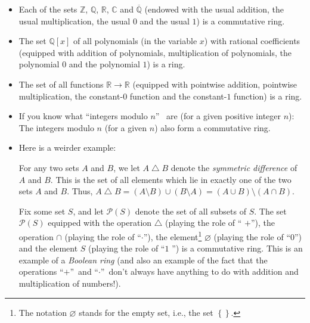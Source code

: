 \documentclass[numbers=enddot,12pt,final,onecolumn,notitlepage]{scrartcl}%
\theoremstyle{definition}
\begin{document}
\begin{itemize}
\item Each of the sets $\mathbb{Z}$, $\mathbb{Q}$, $\mathbb{R}$, $\mathbb{C}$
and $\overline{\mathbb{Q}}$ (endowed with the usual addition, the usual
multiplication, the usual $0$ and the usual $1$) is a commutative ring.

\item The set $\mathbb{Q}\left[  x\right]  $ of all polynomials (in the
variable $x$) with rational coefficients (equipped with addition of
polynomials, multiplication of polynomials, the polynomial $0$ and the
polynomial $1$) is a ring.

\item The set of all functions $\mathbb{R}\rightarrow\mathbb{R}$ (equipped
with pointwise addition, pointwise multiplication, the constant-$0$ function
and the constant-$1$ function) is a ring.

\item If you know what \textquotedblleft integers modulo $n$\textquotedblright%
\ are (for a given positive integer $n$): The integers modulo $n$ (for a given
$n$) also form a commutative ring.

\item Here is a weirder example:

For any two sets $A$ and $B$, we let $A\bigtriangleup B$ denote the
\textit{symmetric difference} of $A$ and $B$. This is the set of all elements
which lie in exactly one of the two sets $A$ and $B$. Thus, $A\bigtriangleup
B=\left(  A\setminus B\right)  \cup\left(  B\setminus A\right)  =\left(  A\cup
B\right)  \setminus\left(  A\cap B\right)  $.

Fix some set $S$, and let $\mathcal{P}\left(  S\right)  $ denote the set of
all subsets of $S$. The set $\mathcal{P}\left(  S\right)  $ equipped with the
operation $\bigtriangleup$ (playing the role of \textquotedblleft%
$+$\textquotedblright), the operation $\cap$ (playing the role of
\textquotedblleft$\cdot$\textquotedblright), the element\footnote{The notation
$\varnothing$ stands for the empty set, i.e., the set $\left\{  {}\right\}
$.} $\varnothing$ (playing the role of \textquotedblleft$0$\textquotedblright)
and the element $S$ (playing the role of \textquotedblleft$1$%
\textquotedblright) is a commutative ring. This is an example of a
\textit{Boolean ring} (and also an example of the fact that the operations
\textquotedblleft$+$\textquotedblright\ and \textquotedblleft$\cdot
$\textquotedblright\ don't always have anything to do with addition and
multiplication of numbers!).
\end{itemize}
\end{document}
